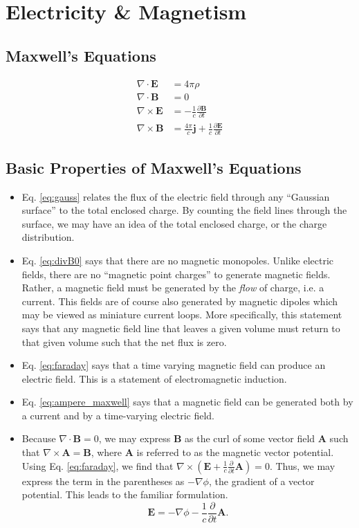 \chapter{Electricity \& Magnetism}

\section{Maxwell's Equations}
\begin{align}
	\nabla\cdot\mathbf{E}&=4\pi\rho \label{eq:gauss}\\[0.5em]
	\nabla\cdot\mathbf{B}&=0 \label{eq:divB0}\\[0.5em]
	\nabla\times\mathbf{E}&=-\frac{1}{c}\frac{\partial\mathbf{B}}{\partial t} \label{eq:faraday}\\[0.5em]
	\nabla\times\mathbf{B}&=\frac{4\pi}{c}\mathbf{j} + \frac{1}{c}\frac{\partial\mathbf{E}}{\partial t} \label{eq:ampere_maxwell}
\end{align}

\section{Basic Properties of Maxwell's Equations}
\begin{itemize}
	\item Eq. \ref{eq:gauss} relates the flux of the electric field through any ``Gaussian surface'' to the total enclosed charge. By counting the field lines through the surface, we may have an idea of the total enclosed charge, or the charge distribution.
	\item Eq. \ref{eq:divB0} says that there are no magnetic monopoles. Unlike electric fields, there are no ``magnetic point charges'' to generate magnetic fields. Rather, a magnetic field must be generated by the \textit{flow} of charge, i.e. a current. This fields are of course also generated by magnetic dipoles which may be viewed as miniature current loops. More specifically, this statement says that any magnetic field line that leaves a given volume must return to that given volume such that the net flux is zero. 
	\item Eq. \ref{eq:faraday} says that a time varying magnetic field can produce an electric field. This is a statement of electromagnetic induction.
	\item Eq. \ref{eq:ampere_maxwell} says that a magnetic field can be generated both by a current and by a time-varying electric field.
	\item Because $\nabla\cdot\mathbf{B}=0$, we may express $\mathbf{B}$ as the curl of some vector field $\mathbf{A}$ such that $\nabla\times\mathbf{A}=\mathbf{B}$, where $\mathbf{A}$ is referred to as the magnetic vector potential. Using Eq. \ref{eq:faraday}, we find that $\nabla\times\left(\mathbf{E} + \frac{1}{c}\frac{\partial}{\partial t}\mathbf{A}\right) = 0$. Thus, we may express the term in the parentheses as $-\nabla\phi$, the gradient of a vector potential. This leads to the familiar formulation.
	\begin{equation}
		\mathbf{E} = -\nabla\phi - \frac{1}{c}\frac{\partial }{\partial t}\mathbf{A}.
	\end{equation}
\end{itemize}
%
